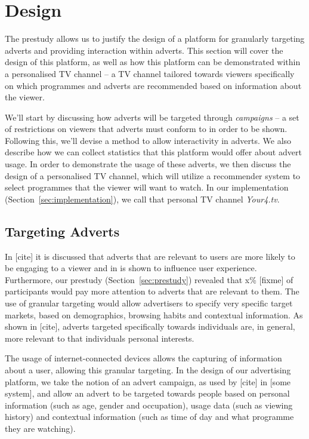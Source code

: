 \section{Design}

The prestudy allows us to justify the design of a platform for granularly targeting adverts and providing interaction within adverts. This section will cover the design of this platform, as well as how this platform can be demonstrated within a personalised TV channel -- a TV channel tailored towards viewers specifically on which programmes and adverts are recommended based on information about the viewer.

We'll start by discussing how adverts will be targeted through \textit{campaigns} -- a set of restrictions on viewers that adverts must conform to in order to be shown. Following this, we'll devise a method to allow interactivity in adverts. We also describe how we can collect statistics that this platform would offer about advert usage. In order to demonstrate the usage of these adverts, we then discuss the design of a personalised TV channel, which will utilize a recommender system to select programmes that the viewer will want to watch. In our implementation (Section~\ref{sec:implementation}), we call that personal TV channel \textit{Your4.tv}.

\subsection{Targeting Adverts}
	\label{sec:design_adverts}

	In [cite] it is discussed that adverts that are relevant to users are more likely to be engaging to a viewer and in \citet{yahoo-intrusive-advertising} is shown to influence user experience. Furthermore, our prestudy (Section~\ref{sec:prestudy}) revealed that x\% [fixme] of participants would pay more attention to adverts that are relevant to them. The use of granular targeting would allow advertisers to specify very specific target markets, based on demographics, browsing habits and contextual information. As shown in [cite], adverts targeted specifically towards individuals are, in general, more relevant to that individuals personal interests.

	The usage of internet-connected devices allows the capturing of information about a user, allowing this granular targeting. In the design of our advertising platform, we take the notion of an advert campaign, as used by [cite] in [some system], and allow an advert to be targeted towards people based on personal information (such as age, gender and occupation), usage data (such as viewing history) and contextual information (such as time of day and what programme they are watching).


